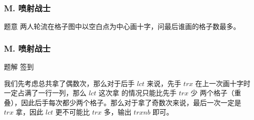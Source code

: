 \renewcommand{\problemname}{M. 喷射战士}

\begin{frame}\frametitle{\problemname}
	
	\begin{block}{题意}
		两人轮流在格子图中以空白点为中心画十字，问最后谁画的格子数最多。
	\end{block}
\end{frame}

\begin{frame}\frametitle{\problemname}
	
	\begin{block}{题解}
		签到
		
		我们先考虑总共拿了偶数次，那么对于后手 $lct$ 来说，先手 $trx$ 在上一次画十字时一定占满了一行一列，那么 $lct$ 这次拿			的情况只能比先手 $trx$ 少	两个格子（重叠），因此后手每次都少两个格子。那么对于拿了奇数次来说，最后一次一定是 $trx$ 				拿，因此 $lct$ 更不可能比 $trx$ 多，输出 $trxnb$ 即可。
	\end{block}
\end{frame}